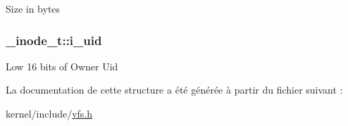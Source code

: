 \-Size in bytes \hypertarget{struct__inode__t_a7ddcb65050ac0b4c9cfbacd495d56f4b}{
\subsubsection[{i\-\_\-uid}]{ {\bf \-\_\-inode\-\_\-t\-::i\-\_\-uid}}}\label{struct__inode__t_a7ddcb65050ac0b4c9cfbacd495d56f4b}
\-Low 16 bits of \-Owner \-Uid 

\-La documentation de cette structure a été générée à partir du fichier suivant \-:\begin{DoxyCompactItemize}
\item 
kernel/include/\hyperlink{vfs_8h}{vfs.\-h}\end{DoxyCompactItemize}
